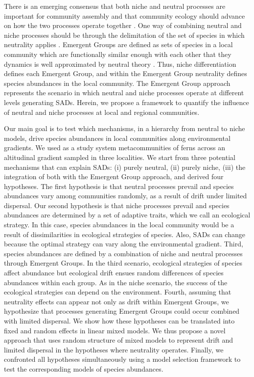 \documentclass[12pt]{article}
\begin{document}
There is an emerging consensus that both niche and neutral processes are important for community assembly \citep{Vellend2014} and that community ecology should advance on how the two processes operate together \citep{Gravel2006, Herault2007}. One way of combining neutral and niche processes should be through the delimitation 
of the set of species in which neutrality applies \citep{Tilman2004, Scheffer2006, Herault2007, Holt2007}. Emergent Groups are defined as sets of species in a local community which are functionally similar enough with each other that they dynamics is well approximated by neutral theory \citep{Herault2007}. Thus, niche differentiation defines each Emergent Group, and within the Emergent Group neutrality defines species abundances in the local community. The Emergent Group approach represents the scenario in which neutral and niche processes operate at different levels generating SADs. Herein, we propose a framework to quantify the influence of neutral and niche processes at local and regional communities.  

Our main goal is to test which mechanisms, in a hierarchy from neutral to niche models, drive species abundances in local communities along environmental gradients. We used as a study system metacommunities of ferns across an altitudinal gradient sampled in three localities. 
We start from three potential mechanisms that can explain SADs: (i) purely neutral,  (ii) purely niche, (iii) the integration of both with the Emergent Group approach, and derived four hypotheses.
The first hypothesis is that neutral processes prevail and species abundances vary among communities randomly, as a result of drift under limited dispersal.
Our second hypothesis is that niche processes prevail and species abundances are determined by a set of adaptive traits, which we call an ecological strategy. 
In this case, species abundances in the local community would be a result of dissimilarities in ecological strategies of species.
Also, SADs can change because the optimal strategy can vary along the environmental gradient. 
Third, species abundances are defined by a combination of niche and neutral processes through Emergent Groups. In the third scenario, ecological strategies of species affect abundance but ecological drift ensues random differences of species abundances within each group. As in the niche scenario, the success of the ecological strategies can depend on the environment.
Fourth, assuming that neutrality effects can appear not only as drift within Emergent Groups, we hypothesize that processes generating Emergent Groups could occur combined with limited dispersal. 
We show how these hypotheses can be translated into fixed and random effects in linear mixed models.
We thus propose a novel approach that uses random structure of mixed models to represent
drift and limited dispersal in the hypotheses where neutrality operates.  Finally, we confronted all hypotheses simultaneously using a model selection framework 
to test the corresponding models of species abundances.
\end{document}

